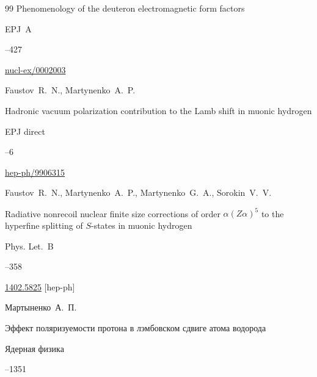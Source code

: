 \begin{thebibliography}{99}
\paper Phenomenology of the deuteron electromagnetic form factors 

\jour EPJ~A




--427


\arxiv \href{http://arxiv.org/abs/nucl-ex/0002003}{nucl-ex/0002003}




\by Faustov~R.~N., Martynenko~A.~P.

\paper Hadronic vacuum polarization contribution to the Lamb shift in muonic hydrogen

\jour EPJ direct 




--6

\arxiv \href{http://arxiv.org/abs/hep-ph/9906315}{hep-ph/9906315}





\by Faustov~R.~N., Martynenko~A.~P., Martynenko~G.~A., Sorokin~V.~V.

\paper Radiative nonrecoil nuclear finite size corrections of order $\alpha(Z\alpha)^5$ to the hyperfine splitting of $S$-states in muonic hydrogen

\jour Phys. Let.~B



--358


\arxiv \href{http://arxiv.org/abs/1402.5825}{1402.5825} [hep-ph]




\by Мартыненко~А.~П.

\paper Эффект поляризуемости протона в лэмбовском сдвиге атома водорода

\jour Ядерная физика




--1351


\end{thebibliography}
